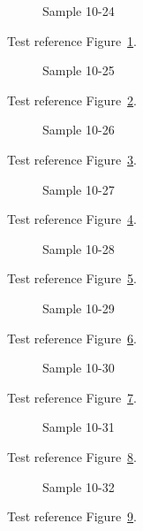 \begin{figure}[tbhp]
\caption{Sample 10-24}
\label{fig:sample-10-24}
\end{figure}

Test reference Figure~\ref{fig:sample-10-24}.

\begin{figure}[tbhp]
\caption{Sample 10-25}
\label{fig:sample-10-25}
\end{figure}

Test reference Figure~\ref{fig:sample-10-25}.

\begin{figure}[tbhp]
\caption{Sample 10-26}
\label{fig:sample-10-26}
\end{figure}

Test reference Figure~\ref{fig:sample-10-26}.

\begin{figure}[tbhp]
\caption{Sample 10-27}
\label{fig:sample-10-27}
\end{figure}

Test reference Figure~\ref{fig:sample-10-27}.

\begin{figure}[tbhp]
\caption{Sample 10-28}
\label{fig:sample-10-28}
\end{figure}

Test reference Figure~\ref{fig:sample-10-28}.

\begin{figure}[tbhp]
\caption{Sample 10-29}
\label{fig:sample-10-29}
\end{figure}

Test reference Figure~\ref{fig:sample-10-29}.

\begin{figure}[tbhp]
\caption{Sample 10-30}
\label{fig:sample-10-30}
\end{figure}

Test reference Figure~\ref{fig:sample-10-30}.

\begin{figure}[tbhp]
\caption{Sample 10-31}
\label{fig:sample-10-31}
\end{figure}

Test reference Figure~\ref{fig:sample-10-31}.

\begin{figure}[tbhp]
\caption{Sample 10-32}
\label{fig:sample-10-32}
\end{figure}

Test reference Figure~\ref{fig:sample-10-32}.

